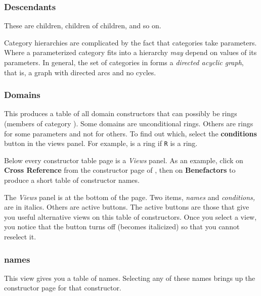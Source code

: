 \subsubsection{Descendants}

These are children, children of children, and so on.

Category hierarchies are complicated by the fact that categories take
parameters.
Where a parameterized category fits into a hierarchy {\it may} depend on
values of its parameters.
In general, the set of categories in \Language{} forms a {\it directed
acyclic graph}, that is, a graph with directed arcs and no cycles.

\subsubsection{Domains}

This produces a table of all domain constructors that can possibly be
rings (members of category ).
Some domains are unconditional rings.
Others are rings for some parameters and not for others.
To find out which, select the {\bf conditions} button in the views
panel.
For example,  is a ring if {\tt R} is a
ring.




Below every constructor table page is a {\it Views} panel.
As an example, click on {\bf Cross Reference} from
the constructor page of ,
then on {\bf Benefactors} to produce a
short table of constructor names.

The {\it Views} panel is at the bottom of the page.
Two items, {\it names} and {\it conditions,} are in italics.
Others are active buttons.
The active buttons are those that give you useful alternative views
on this table of constructors.
Once you select a view, you notice that the button turns
off (becomes italicized) so that you cannot reselect it.

\subsubsection{names}

This view gives you a table of names.
Selecting any of these names brings up the constructor page for that
constructor.

